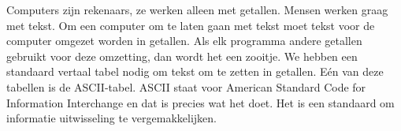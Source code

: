 Computers zijn rekenaars, ze werken alleen met getallen. Mensen werken graag met tekst. Om een computer om te laten gaan met tekst moet tekst voor de computer omgezet worden in getallen. Als elk programma andere getallen gebruikt voor deze omzetting, dan wordt het een zooitje. We hebben een standaard vertaal tabel nodig om tekst om te zetten in getallen. E\'en van deze tabellen is de ASCII-tabel. ASCII staat voor American Standard Code for Information Interchange en dat is precies wat het doet. Het is een standaard om informatie uitwisseling te vergemakkelijken.
